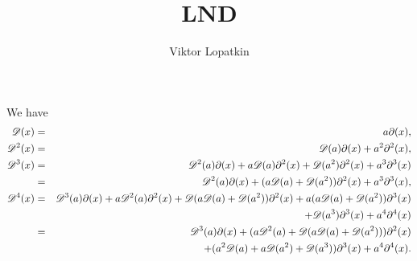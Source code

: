  We have 
\begin{eqnarray*}
 \D(x) &=& a\partial(x), \\
 \D^2(x) &=& \D(a) \partial(x) + a^2\partial^2(x),\\
 \D^3(x) &=& \D^2(a) \partial(x) + a\D(a)\partial^2(x) + \D(a^2)\partial^2(x) + a^3 \partial^3(x) \\
 &=& \D^2(a)\partial(x) + (a\D(a) + \D(a^2))\partial^2(x) + a^3\partial^3(x),\\
 \D^4(x) &=& \D^3(a)\partial(x) + a\D^2(a)\partial^2(x) + \D(a\D(a) + \D(a^2))\partial^2(x) + a(a\D(a) + \D(a^2))\partial^3(x)\\
 &&+ \D(a^3)\partial^3(x) + a^4 \partial^4(x) \\
 &=& \D^3(a)\partial(x) + ( a\D^2(a) + \D(a\D(a) + \D(a^2)) ) \partial^2(x) \\
 &&+ (a^2\D(a) + a\D(a^2) + \D(a^3))\partial^3(x) + a^4\partial^4(x).
\end{eqnarray*}


\documentclass[a4paper]{article}

\usepackage[english]{babel}
\usepackage[utf8x]{inputenc}
\usepackage[T1]{fontenc}
\usepackage{amsfonts}
\usepackage{mathrsfs}

\usepackage[sc]{mathpazo}
\linespread{1.05}


\usepackage[a4paper,top=3cm,bottom=2cm,left=3cm,right=3cm,marginparwidth=1.75cm]{geometry}

\usepackage{amsmath}
\usepackage{amssymb}
\usepackage{amsthm}
\usepackage{graphicx}
\usepackage[colorinlistoftodos]{todonotes}
\usepackage[colorlinks=true, allcolors=blue]{hyperref}

\usepackage{BOONDOX-frak} %
\newtheorem{theorem}{Theorem}[section]
\newtheorem{lemma}[theorem]{Lemma}
\newtheorem{proposition}[theorem]{Proposition}
\newtheorem{corollary}[theorem]{Corollary}


\theoremstyle{definition}
\newtheorem{definition}[theorem]{Definition}
\newtheorem{example}[theorem]{Example}
\newtheorem{remark}[theorem]{Remark}
\newtheorem{construction}[theorem]{Construction}

\newcommand{\D}{\mathscr{D}}
\newcommand{\n}{\mathbf{n}}


\usepackage{array}
\newcolumntype{P}[1]{>{\centering\arraybackslash}p{#1}}
\usepackage{multirow}


\title{LND}
\author{Viktor Lopatkin}





